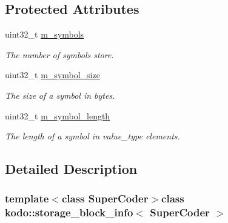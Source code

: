 \subsection*{Protected Attributes}
\begin{DoxyCompactItemize}
\item 
\hypertarget{classkodo_1_1storage__block__info_a657e8693f909e68aa86f082a629cbc63}{uint32\-\_\-t \hyperlink{classkodo_1_1storage__block__info_a657e8693f909e68aa86f082a629cbc63}{m\-\_\-symbols}}\label{classkodo_1_1storage__block__info_a657e8693f909e68aa86f082a629cbc63}

\begin{DoxyCompactList}\small\item\em The number of symbols store. \end{DoxyCompactList}\item 
\hypertarget{classkodo_1_1storage__block__info_ab5943e5affa6c2455fa95ace7d534bb8}{uint32\-\_\-t \hyperlink{classkodo_1_1storage__block__info_ab5943e5affa6c2455fa95ace7d534bb8}{m\-\_\-symbol\-\_\-size}}\label{classkodo_1_1storage__block__info_ab5943e5affa6c2455fa95ace7d534bb8}

\begin{DoxyCompactList}\small\item\em The size of a symbol in bytes. \end{DoxyCompactList}\item 
\hypertarget{classkodo_1_1storage__block__info_a5bf949c672802c83beaa84de25bbf2a5}{uint32\-\_\-t \hyperlink{classkodo_1_1storage__block__info_a5bf949c672802c83beaa84de25bbf2a5}{m\-\_\-symbol\-\_\-length}}\label{classkodo_1_1storage__block__info_a5bf949c672802c83beaa84de25bbf2a5}

\begin{DoxyCompactList}\small\item\em The length of a symbol in value\-\_\-type elements. \end{DoxyCompactList}\end{DoxyCompactItemize}


\subsection{Detailed Description}
\subsubsection*{template$<$class Super\-Coder$>$class kodo\-::storage\-\_\-block\-\_\-info$<$ Super\-Coder $>$}

